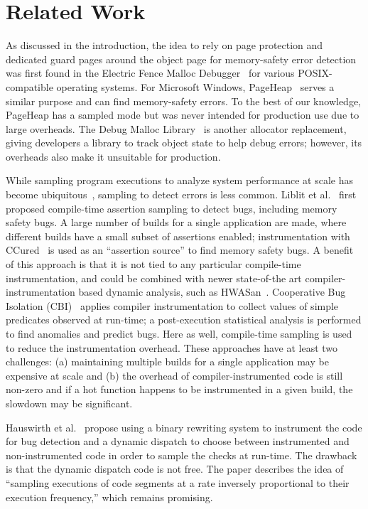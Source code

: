 \section{Related Work}
\label{sec:related}

As discussed in the introduction, the idea to rely on page protection and
dedicated guard pages around the object page for memory-safety error detection
was first found in the Electric Fence Malloc Debugger~\cite{EFence} for various
POSIX-compatible operating systems. For Microsoft Windows,
PageHeap~\cite{PageHeap} serves a similar purpose and can find memory-safety
errors. To the best of our knowledge, PageHeap has a sampled mode but was never
intended for production use due to large overheads. The Debug Malloc
Library~\cite{DMalloc} is another allocator replacement, giving developers a
library to track object state to help debug errors; however, its overheads also
make it unsuitable for production.

While sampling program executions to analyze system performance at scale has
become ubiquitous~\cite{RenTMSRH2010}, sampling to detect errors is less
common. Liblit et al.~\cite{LiblitAZJ2003} first proposed compile-time
assertion sampling to detect bugs, including memory safety bugs. A large number
of builds for a single application are made, where different builds have a
small subset of assertions enabled; instrumentation with
CCured~\cite{NeculaMW2002} is used as an ``assertion source'' to find memory
safety bugs. A benefit of this approach is that it is not tied to any
particular compile-time instrumentation, and could be combined with newer
state-of-the art compiler-instrumentation based dynamic analysis, such as
HWASan~\cite{SerebryanySSTV2018}. Cooperative Bug Isolation
(CBI)~\cite{NainarCRL2007} applies compiler instrumentation to collect values
of simple predicates observed at run-time; a post-execution statistical
analysis is performed to find anomalies and predict bugs. Here as well,
compile-time sampling is used to reduce the instrumentation overhead.  These
approaches have at least two challenges: (a) maintaining multiple builds for a
single application may be expensive at scale and (b) the overhead of
compiler-instrumented code is still non-zero and if a hot function happens to
be instrumented in a given build, the slowdown may be significant.

Hauswirth et al.~\cite{HauswirthC2004} propose using a binary rewriting system
to instrument the code for bug detection and a dynamic dispatch to choose
between instrumented and non-instrumented code in order to sample the checks at
run-time. The drawback is that the dynamic dispatch code is not free. The paper
describes the idea of ``sampling executions of code segments at a rate
inversely proportional to their execution frequency,'' which remains promising.
